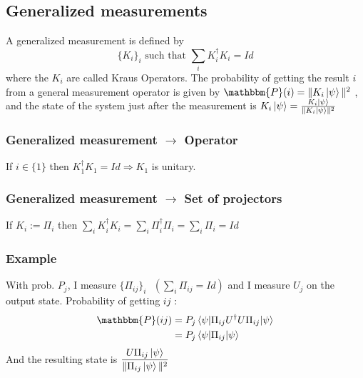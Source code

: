 \documentclass{article}
\begin{document}
\subsection{Generalized measurements}
A generalized measurement is defined by
\begin{equation}
    \{K_i\}_i \text{ such that } \sum_i K_i^\dagger K_i=Id
\end{equation}
where the $K_i$ are called Kraus Operators.
The probability of getting the result $i$ from a general measurement operator is given by
$\mathbbm{P}(i) = \|K_i\ket{\psi}\|^2$
, and the state of the system just after the measurement is $K_i\ket{\psi}=\frac{K_i\ket{\psi}}{\|K_i\ket{\psi}\|^2}$

\subsubsection*{Generalized measurement $\rightarrow$ Operator}
If $i \in \{1\}$ then
$K_1^\dagger K_1=Id \Rightarrow K_1$ is unitary.%

\subsubsection*{Generalized measurement $\rightarrow$ Set of projectors}
If $K_i := \Pi_i$ then $\sum_i K_i^\dagger K_i = \sum_i \Pi_i^\dagger\Pi_i = \sum_i \Pi_i = Id$

\subsubsection*{Example}
With prob. $P_j$, I measure $\{\Pi_{ij}\}_i \text{ } (\sum_i \Pi_{ij} = Id)$ and I measure $U_j$ on the output state.
Probability of getting $ij$ :
\begin{equation}
    \begin{aligned}
        \mathbbm{P}(ij)
            &= P_j\braket{\psi | \Pi_{ij} U^\dagger U \Pi_{ij} | \psi} \\
            &= P_j\braket{\psi|\Pi_{ij}|\psi}
    \end{aligned}
\end{equation}
\noindent
And the resulting state is $\dfrac{U\Pi_{ij}\ket{\psi}}{\|\Pi_{ij}\ket{\psi}\|^2}$
\end{document}
